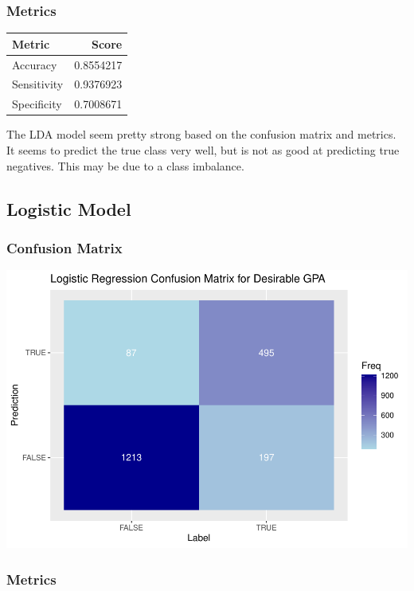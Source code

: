 \documentclass[
]{article}
\begin{document}
\subsubsection{Metrics}\label{metrics}

\begin{longtable}[]{@{}lr@{}}
\toprule\noalign{}
Metric & Score \\
\midrule\noalign{}
\endhead
\bottomrule\noalign{}
\endlastfoot
Accuracy & 0.8554217 \\
Sensitivity & 0.9376923 \\
Specificity & 0.7008671 \\
\end{longtable}

The LDA model seem pretty strong based on the confusion matrix and
metrics. It seems to predict the true class very well, but is not as
good at predicting true negatives. This may be due to a class imbalance.

\subsection{Logistic Model}\label{logistic-model}

\subsubsection{Confusion Matrix}\label{confusion-matrix-1}

\includegraphics{ST494_FP_files/figure-latex/unnamed-chunk-34-1.pdf}

\subsubsection{Metrics}\label{metrics-1}
\end{document}
